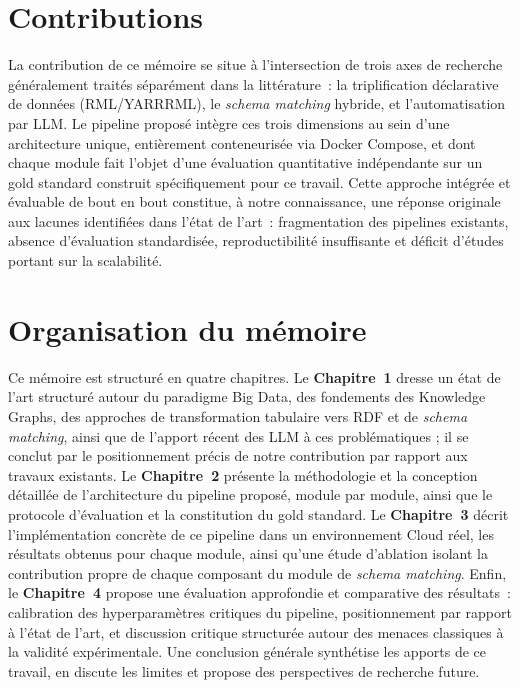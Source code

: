 \section*{Contributions}
 
La contribution de ce mémoire se situe à l'intersection de trois
axes de recherche généralement traités séparément dans la
littérature~: la triplification déclarative de données (RML/YARRRML),
le \textit{schema matching} hybride, et l'automatisation par LLM.
Le pipeline proposé intègre ces trois dimensions au sein d'une
architecture unique, entièrement conteneurisée via Docker Compose,
et dont chaque module fait l'objet d'une évaluation quantitative
indépendante sur un gold standard construit spécifiquement pour ce
travail. Cette approche intégrée et évaluable de bout en bout
constitue, à notre connaissance, une réponse originale aux lacunes
identifiées dans l'état de l'art~: fragmentation des pipelines
existants, absence d'évaluation standardisée, reproductibilité
insuffisante et déficit d'études portant sur la scalabilité.
 
\section*{Organisation du mémoire}
 
Ce mémoire est structuré en quatre chapitres. Le
\textbf{Chapitre~1} dresse un état de l'art structuré autour du
paradigme Big Data, des fondements des Knowledge Graphs, des
approches de transformation tabulaire vers RDF et de
\textit{schema matching}, ainsi que de l'apport récent des LLM à ces
problématiques ; il se conclut par le positionnement précis de notre
contribution par rapport aux travaux existants. Le
\textbf{Chapitre~2} présente la méthodologie et la conception
détaillée de l'architecture du pipeline proposé, module par module,
ainsi que le protocole d'évaluation et la constitution du gold
standard. Le \textbf{Chapitre~3} décrit l'implémentation concrète de
ce pipeline dans un environnement Cloud réel, les résultats obtenus
pour chaque module, ainsi qu'une étude d'ablation isolant la
contribution propre de chaque composant du module de
\textit{schema matching}. Enfin, le \textbf{Chapitre~4} propose une
évaluation approfondie et comparative des résultats~: calibration
des hyperparamètres critiques du pipeline, positionnement par rapport
à l'état de l'art, et discussion critique structurée autour des
menaces classiques à la validité expérimentale. Une conclusion
générale synthétise les apports de ce travail, en discute les limites
et propose des perspectives de recherche future.
 